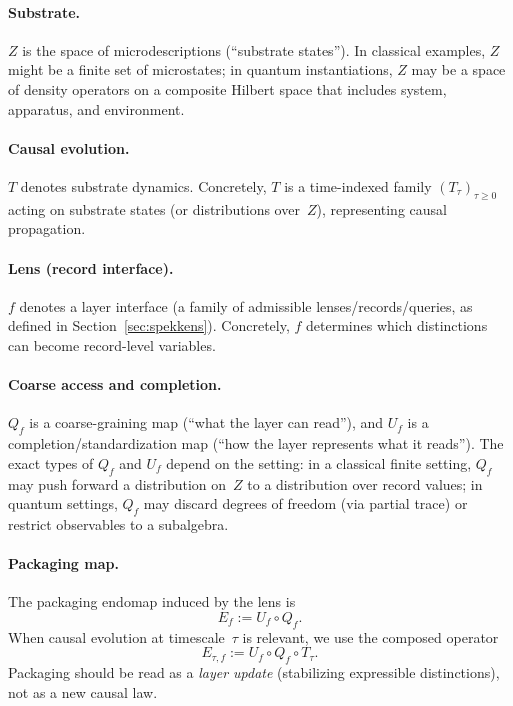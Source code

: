 \paragraph{Substrate.}
$Z$ is the space of microdescriptions (``substrate states''). In classical examples, $Z$ might be a finite set of microstates; in quantum instantiations, $Z$ may be a space of density operators on a composite Hilbert space that includes system, apparatus, and environment.

\paragraph{Causal evolution.}
$T$ denotes substrate dynamics. Concretely, $T$ is a time-indexed family $(T_\tau)_{\tau\ge 0}$ acting on substrate states (or distributions over~$Z$), representing causal propagation.

\paragraph{Lens (record interface).}
$f$ denotes a layer interface (a family of admissible lenses/records/queries, as defined in Section~\ref{sec:spekkens}). Concretely, $f$ determines which distinctions can become record-level variables.

\paragraph{Coarse access and completion.}
$Q_f$ is a coarse-graining map (``what the layer can read''), and $U_f$ is a completion/standardization map (``how the layer represents what it reads'').
The exact types of $Q_f$ and $U_f$ depend on the setting:
in a classical finite setting, $Q_f$ may push forward a distribution on~$Z$ to a distribution over record values;
in quantum settings, $Q_f$ may discard degrees of freedom (via partial trace) or restrict observables to a subalgebra.

\paragraph{Packaging map.}
The packaging endomap induced by the lens is
\[
E_f := U_f \circ Q_f.
\]
When causal evolution at timescale~$\tau$ is relevant, we use the composed operator
\[
E_{\tau,f} := U_f \circ Q_f \circ T_\tau .
\]
Packaging should be read as a \emph{layer update} (stabilizing expressible distinctions), not as a new causal law.

